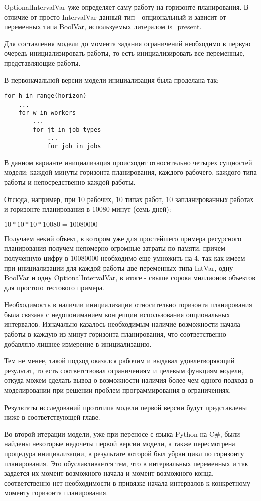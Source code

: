 OptionalIntervalVar уже определяет саму работу на горизонте планирования. В отличие от просто IntervalVar данный тип - опциональный и зависит от переменных типа BoolVar, используемых литералом is\_present.

Для составления модели до момента задания ограничений необходимо в первую очередь инициализировать работы, то есть инициализировать все переменные, представляющие работы.

В первоначальной версии модели инициализация была проделана так:
\begin{verbatim}
for h in range(horizon)
    ...
    for w in workers
        ...
        for jt in job_types
            ...
            for job in jobs
\end{verbatim}

В данном варианте инициализация происходит относительно четырех сущностей модели: каждой минуты горизонта планирования, каждого рабочего, каждого типа работы и непосредственно каждой работы.

Отсюда, например, при 10 рабочих, 10 типах работ, 10 запланированных работах и горизонте планирования в 10080 минут (семь дней):

$10 * 10 * 10 * 10080 = 10080000$

Получаем некий объект, в котором уже для простейшего примера ресурсного планирования получем непомерно огромные затраты по памяти, причем полученную цифру в 10080000 необходимо еще умножить на 4, так как имеем при инициализации для каждой работы две переменных типа IntVar, одну BoolVar и одну OptionalIntervalVar, в итоге - свыше сорока миллионов объектов для простого тестового примера.

Необходимость в наличии инициализации относительно горизонта планирования была связана с недопониманием концепции использования опциональных интервалов. Изначально казалось необходимым наличие возможности начала работы в каждую из минут горизонта планирования, что соответственно добавляло лишнее измерение в инициализацию.

Тем не менее, такой подход оказался рабочим и выдавал удовлетворяющий результат, то есть соответствовал ограничениям и целевым функциям модели, откуда можем сделать вывод о возможности наличия более чем одного подхода в моделировании при решении проблем программирования в ограничениях.

Результаты исследований прототипа модели первой версии будут представлены ниже в соответствующей главе.

Во второй итерации модели, уже при переносе с языка Python на C\#, были найдены некоторые недочеты первой версии модели, а также пересмотрена процедура инициализации, в результате которой был убран цикл по горизонту планирования. Это обуславливается тем, что в интервальных переменных и так задается их момент возможного начала и момент возможного конца, соответственно нет необходимости в привязке начала интервалов к конкретному моменту горизонта планирования.


